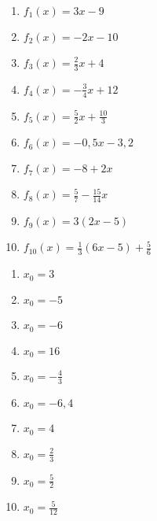 \begin{Exercise}[title={Bestimme die Nullstellen}, label=nullstellenA1]

	\begin{minipage}{0.5\textwidth}
		\begin{enumerate}[label=\alph*)]
			\item \(f_1(x)=3x-9\)
			\item \(f_2(x)=-2x-10\)
			\item \(f_3(x)=\frac{2}{3}x+4\)
			\item \(f_4(x)=-\frac{3}{4}x+12\)
			\item \(f_5(x)=\frac{5}{2}x+\frac{10}{3}\)
		\end{enumerate}
	\end{minipage}%
	\begin{minipage}{0.5\textwidth}
		\begin{enumerate}[label=\alph*)]
			\setcounter{enumi}{5}
			\item \(f_6(x)=-0,5x-3,2\)
			\item \(f_7(x)=-8+2x\)
			\item \(f_8(x)=\frac{5}{7}-\frac{15}{14}x\)
			\item \(f_9(x)=3(2x-5)\)
			\item \(f_{10}(x)=\frac{1}{3}\left(6x-5\right)+\frac{5}{6}\)
		\end{enumerate}
	\end{minipage}%
\end{Exercise}\vspace{0,5cm}
\begin{Answer}[ref=nullstellenA1]

	\begin{minipage}{0.5\textwidth}
		\begin{enumerate}[label=\alph*)]
			\item \(x_0=3\)
			\item \(x_0=-5\)
			\item \(x_0=-6\)
			\item \(x_0=16\)
			\item \(x_0=-\frac{4}{3}\)
		\end{enumerate}
	\end{minipage}%
	\begin{minipage}{0.5\textwidth}
		\begin{enumerate}[label=\alph*)]
			\setcounter{enumi}{5}
			\item \(x_0=-6,4\)
			\item \(x_0=4\)
			\item \(x_0=\frac{2}{3}\)
			\item \(x_0=\frac{5}{2}\)
			\item \(x_0=\frac{5}{12}\)
		\end{enumerate}
	\end{minipage}%
\end{Answer}